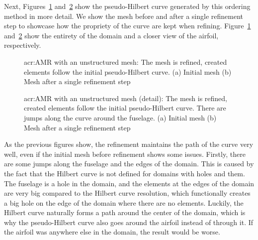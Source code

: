 Next, Figures~\ref{fig:mesh_P0_adaptivity_far} and~\ref{fig:mesh_P0_adaptivity_near} show the
pseudo-Hilbert curve generated by this ordering method in more detail. We show the mesh before and
after a single refinement step to showcase how the propriety of the curve are kept when refining.
Figure~\ref{fig:mesh_P0_adaptivity_far} and~\ref{fig:mesh_P0_adaptivity_near} show the entirety of
the domain and a closer view of the airfoil, respectively.

\begin{figure}[H]
	\centering
	\caption{\Acrlong{acr:AMR} with an unstructured mesh: The mesh is refined, created elements follow the initial pseudo-Hilbert curve. (a) Initial mesh (b) Mesh after a single refinement step}\label{fig:mesh_P0_adaptivity_far}
\end{figure}

\begin{figure}[H]
	\centering
	\caption{\Acrlong{acr:AMR} with an unstructured mesh (detail): The mesh is refined, created elements follow the initial pseudo-Hilbert curve. There are jumps along the curve around the fuselage. (a) Initial mesh (b) Mesh after a single refinement step}\label{fig:mesh_P0_adaptivity_near}
\end{figure}

As the previous figures show, the refinement maintains the path of the curve very well, even if the
initial mesh before refinement shows some issues. Firstly, there are some jumps along the fuselage
and the edges of the domain. This is caused by the fact that the Hilbert curve is not defined for
domains with holes and them. The fuselage is a hole in the domain, and the elements at the edges of
the domain are very big compared to the Hilbert curve resolution, which functionally creates a big
hole on the edge of the domain where there are no elements. Luckily, the Hilbert curve naturally
forms a path around the center of the domain, which is why the pseudo-Hilbert curve also goes around
the airfoil instead of through it. If the airfoil was anywhere else in the domain, the result would
be worse.

